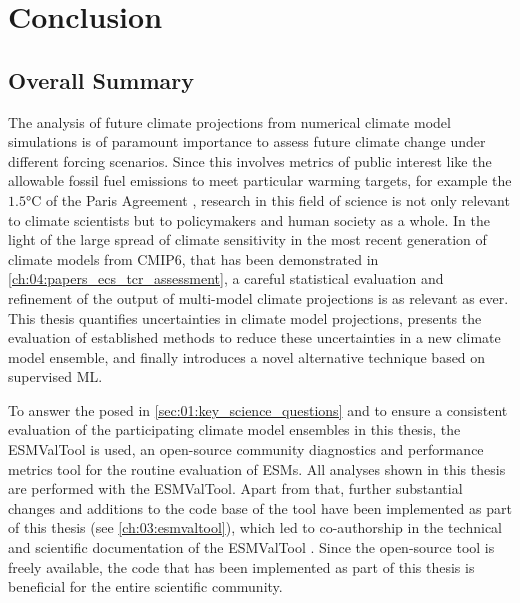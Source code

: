 
%



\chapter{Conclusion}
\label{ch:07:conclusion}


\section{Overall Summary}
\label{sec:07:overall_summary}

The analysis of future climate projections from numerical climate model
simulations is of paramount importance to assess future climate change under
different forcing scenarios. Since this involves metrics of public interest
like the allowable fossil fuel emissions to meet particular warming targets,
for example the $1.5 \unit{\degreeCelsius}$ of the Paris Agreement
\autocite{UNFCCC2015}, research in this field of science is not only relevant
to climate scientists but to policymakers and human society as a whole. In the
light of the large spread of climate sensitivity in the most recent generation
of climate models from \acs{CMIP}6, that has been demonstrated in
\cref{ch:04:papers_ecs_tcr_assessment}, a careful statistical evaluation and
refinement of the output of multi-model climate projections is as relevant as
ever. This thesis quantifies uncertainties in climate model projections,
presents the evaluation of established methods to reduce these uncertainties in
a new climate model ensemble, and finally introduces a novel alternative
technique based on supervised \ac{ML}.

To answer the  posed in
\cref{sec:01:key_science_questions} and to ensure a consistent evaluation of
the participating climate model ensembles in this thesis, the \ac{ESMValTool}
is used, an open-source community diagnostics and performance metrics tool for
the routine evaluation of \acp{ESM}. All analyses shown in this thesis are
performed with the \ac{ESMValTool}. Apart from that, further substantial
changes and additions to the code base of the tool have been implemented as
part of this thesis (see \cref{ch:03:esmvaltool}), which led to co-authorship
in the technical and scientific documentation of the \ac{ESMValTool}
\autocite{Eyring2020, Lauer2020, Righi2020, Weigel2020}. Since the open-source
tool is freely available, the code that has been implemented as part of this
thesis is beneficial for the entire scientific community.

